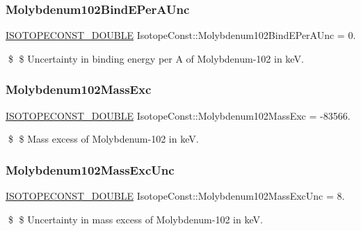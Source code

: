 \subsubsection{\texorpdfstring{Molybdenum102\+Bind\+E\+Per\+A\+Unc}{Molybdenum102BindEPerAUnc}}
{\footnotesize\ttfamily \mbox{\hyperlink{group___isotope_const-_macros_ga8f45a7272ce02c0b4c65c44636ed719a}{I\+S\+O\+T\+O\+P\+E\+C\+O\+N\+S\+T\+\_\+\+D\+O\+U\+B\+LE}} Isotope\+Const\+::\+Molybdenum102\+Bind\+E\+Per\+A\+Unc = 0.}

\$ \$ Uncertainty in binding energy per A of Molybdenum-\/102 in keV. \mbox{\label{group___isotope_const-_molybdenum-_mo102_gae9765158bd4b079bf49ca44f7399b83b}} 
\subsubsection{\texorpdfstring{Molybdenum102\+Mass\+Exc}{Molybdenum102MassExc}}
{\footnotesize\ttfamily \mbox{\hyperlink{group___isotope_const-_macros_ga8f45a7272ce02c0b4c65c44636ed719a}{I\+S\+O\+T\+O\+P\+E\+C\+O\+N\+S\+T\+\_\+\+D\+O\+U\+B\+LE}} Isotope\+Const\+::\+Molybdenum102\+Mass\+Exc = -\/83566.}

\$ \$ Mass excess of Molybdenum-\/102 in keV. \mbox{\label{group___isotope_const-_molybdenum-_mo102_ga568b35cf7fc596d9b1699776778dfbe4}} 
\subsubsection{\texorpdfstring{Molybdenum102\+Mass\+Exc\+Unc}{Molybdenum102MassExcUnc}}
{\footnotesize\ttfamily \mbox{\hyperlink{group___isotope_const-_macros_ga8f45a7272ce02c0b4c65c44636ed719a}{I\+S\+O\+T\+O\+P\+E\+C\+O\+N\+S\+T\+\_\+\+D\+O\+U\+B\+LE}} Isotope\+Const\+::\+Molybdenum102\+Mass\+Exc\+Unc = 8.}

\$ \$ Uncertainty in mass excess of Molybdenum-\/102 in keV. \mbox{\label{group___isotope_const-_molybdenum-_mo102_ga62af6b4852d55358d2bacae578b3734c}} 
